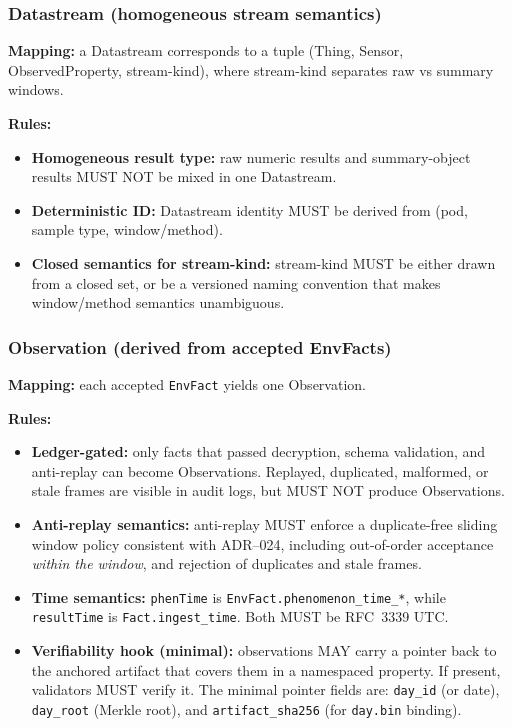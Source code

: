 \subsubsection{Datastream (homogeneous stream semantics)}
\textbf{Mapping:} a Datastream corresponds to a tuple (Thing, Sensor, ObservedProperty, stream-kind), where stream-kind
separates raw vs summary windows.

\textbf{Rules:}
\begin{itemize}[nosep]
  \item \textbf{Homogeneous result type:} raw numeric results and summary-object results MUST NOT be mixed in one
    Datastream.
  \item \textbf{Deterministic ID:} Datastream identity MUST be derived from (pod, sample type, window/method).
  \item \textbf{Closed semantics for stream-kind:} stream-kind MUST be either drawn from a closed set, or be a
    versioned naming convention that makes window/method semantics unambiguous.
\end{itemize}

\subsubsection{Observation (derived from accepted EnvFacts)}
\textbf{Mapping:} each accepted \texttt{EnvFact} yields one Observation.

\textbf{Rules:}
\begin{itemize}[nosep]
  \item \textbf{Ledger-gated:} only facts that passed decryption, schema validation, and anti-replay can become
    Observations.
    Replayed, duplicated, malformed, or stale frames are visible in audit logs, but MUST NOT produce
    Observations.
  \item \textbf{Anti-replay semantics:} anti-replay MUST enforce a duplicate-free sliding window policy consistent with
  \ac{ADR}--024, including out-of-order acceptance \emph{within the window}, and rejection of duplicates and stale frames.
  \item \textbf{Time semantics:} \texttt{phenTime} is \texttt{EnvFact.phenomenon\_time\_*},
    while \texttt{resultTime} is \texttt{Fact.ingest\_time}.
  Both MUST be \ac{RFC}~3339 \ac{UTC}.
  \item \textbf{Verifiability hook (minimal):} observations MAY carry a pointer back to the anchored artifact that covers
    them in a namespaced property.
    If present, validators MUST verify it.
    The minimal pointer fields are:
    \texttt{day\_id} (or date), \texttt{day\_root} (Merkle root), and \texttt{artifact\_sha256} (for \texttt{day.bin} binding).
\end{itemize}

